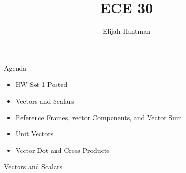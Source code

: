 \documentclass{report}
\title{\Huge{ECE 30}}
\author{\huge{Elijah Hantman}}
\date{}
\begin{document}
\maketitle
\newpage

\begin{description}
    \item Agenda 
        \begin{itemize}
            \item HW Set 1 Posted
            \item Vectors and Scalars
            \item Reference Frames, vector Components, and Vector Sum
            \item Unit Vectors
            \item Vector Dot and Cross Products
        \end{itemize}
\end{description}
{\huge Vectors and Scalars}
\end{document}
